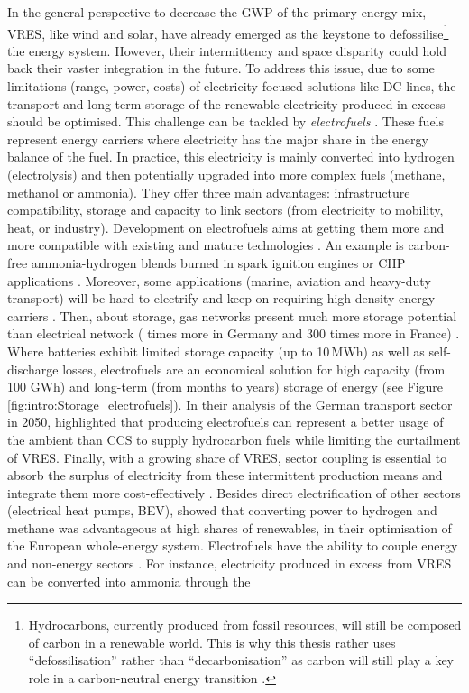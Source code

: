 In the general perspective to decrease the \gls{GWP} of the primary energy mix, \gls{VRES}, like wind and solar, have already emerged as the keystone to defossilise\footnote{Hydrocarbons, currently produced from fossil resources, will still be composed of carbon in a renewable world. This is why this thesis rather uses ``defossilisation'' rather than ``decarbonisation'' as carbon will still play a key role in a carbon-neutral energy transition \cite{mertens2020carbon}.} the energy system. However, their intermittency and space disparity could hold back their vaster integration in the future. To address this issue, due to some limitations (\eg range, power, costs) of electricity-focused solutions like \gls{DC} lines, the transport and long-term storage of the renewable electricity produced in excess should be optimised. This challenge can be tackled by \textit{electrofuels} \cite{rozzi2020}. These fuels represent energy carriers where electricity has the major share in the energy balance of the fuel. In practice, this electricity is mainly converted into hydrogen (\ie electrolysis) and then potentially upgraded into more complex fuels (\eg methane, methanol or ammonia). They offer three main advantages: infrastructure compatibility, storage and capacity to link sectors (\ie from electricity to mobility, heat, or industry). Development on electrofuels aims at getting them more and more compatible with existing and mature technologies \cite{Ahlgren2012}. An example is carbon-free ammonia-hydrogen blends burned in spark ignition engines \cite{lhuillier2020experimental} or \gls{CHP} applications \cite{pochet202022}. Moreover, some applications (\eg marine, aviation and heavy-duty transport) will be hard to electrify and keep on requiring high-density energy carriers \cite{horvath2018techno, brynolf2018}.  Then, about storage, gas networks present much more storage potential than electrical network ( times more in Germany and 300 times more in France) \cite{Rosa2017}. Where batteries exhibit limited storage capacity (up to 10\,MWh) as well as self-discharge losses, electrofuels are an economical solution for high capacity (from 100 GWh) and long-term (\ie from months to years) storage of energy \cite{child2018role, dias2020energy} (see Figure \ref{fig:intro:Storage_electrofuels}). In their analysis of the German transport sector in 2050, \citet{millinger2021electrofuels} highlighted that producing electrofuels can represent a better usage of the ambient  than \gls{CCS} to supply hydrocarbon fuels while limiting the curtailment of \gls{VRES}.  Finally, with a growing share of \gls{VRES}, sector coupling is essential to absorb the surplus of electricity from these intermittent production means \cite{robinius2017linking} and integrate them more cost-effectively \cite{brown2018response, limpensECOS2021}. Besides direct electrification of other sectors (\eg electrical heat pumps, \gls{BEV}), \citet{brown2018synergies} showed that converting power to hydrogen and methane was advantageous at high shares of renewables, in their optimisation of the European whole-energy system. Electrofuels have the ability to couple energy and non-energy sectors \cite{Stancin2020}. For instance, electricity produced in excess from \gls{VRES} can be converted into ammonia through the 